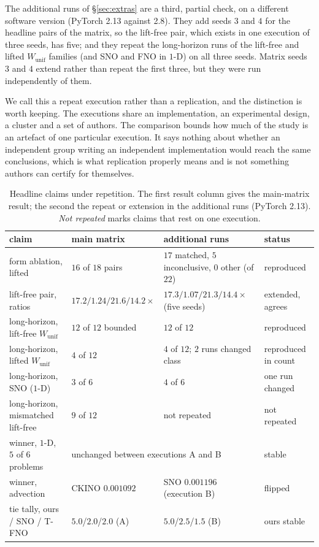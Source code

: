 \documentclass[11pt]{article}
\theoremstyle{definition}
\theoremstyle{remark}
\newcommand{\Wu}{W_{\mathrm{unif}}}
\newcommand{\ckino}{\textsc{CKINO}}
\begin{document}
The additional runs of \S\ref{sec:extras} are a third, partial check, on a
different software version (PyTorch 2.13 against 2.8). They add seeds $3$ and $4$
for the headline pairs of the matrix, so the lift-free pair, which exists in one
execution of three seeds, has five; and they repeat the long-horizon runs of the
lift-free and lifted $\Wu$ families (and SNO and FNO in $1$-D) on all three seeds. Matrix seeds $3$ and $4$
extend rather than repeat the first three, but they were run independently of
them.

We call this a repeat execution rather than a replication, and the distinction is
worth keeping. The executions share an implementation, an experimental design, a
cluster and a set of authors. The comparison bounds how much of the study is an
artefact of one particular execution. It says nothing about whether an
independent group writing an independent implementation would reach the same
conclusions, which is what replication properly means and is not something
authors can certify for themselves.

\begin{table}[htbp]
\centering
\caption{Headline claims under repetition. The first result column gives the
main-matrix result; the second the repeat or extension in the additional runs
(PyTorch 2.13). \emph{Not repeated} marks claims that rest on one execution.}
\label{tab:repro}
\small
\setlength{\tabcolsep}{4pt}
\begin{tabular}{@{}p{43mm}p{33mm}p{52mm}p{25mm}@{}}
\toprule
claim & main matrix & additional runs & status \\
\midrule
form ablation, lifted & $16$ of $18$ pairs & $17$ matched, $5$ inconclusive, $0$ other (of $22$) & reproduced \\
lift-free pair, ratios & $17.2/1.24/21.6/14.2\times$ & $17.3/1.07/21.3/14.4\times$ (five seeds) & extended, agrees \\
long-horizon, lift-free $\Wu$ & $12$ of $12$ bounded & $12$ of $12$ & reproduced \\
long-horizon, lifted $\Wu$ & $4$ of $12$ & $4$ of $12$; $2$ runs changed class & reproduced in count \\
long-horizon, SNO ($1$-D) & $3$ of $6$ & $4$ of $6$ & one run changed \\
long-horizon, mismatched lift-free & $9$ of $12$ & not repeated & not repeated \\
winner, $1$-D, $5$ of $6$ problems & \multicolumn{2}{l}{unchanged between executions A and B} & stable \\
winner, advection & \ckino{} $0.001092$ & SNO $0.001196$ (execution B) & flipped \\
tie tally, ours / SNO / T-FNO & $5.0$/$2.0$/$2.0$ (A) & $5.0$/$2.5$/$1.5$ (B) & ours stable \\
\bottomrule
\end{tabular}
\end{table}
\end{document}
